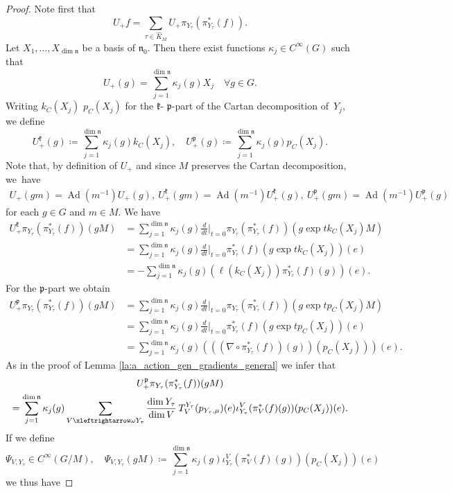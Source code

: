 \documentclass[JEP,XML,SOM,NoFloatCountersInSection,Unicode,published]{cedram}
\theoremstyle{definition}
\renewcommand{\d}[1][t]{\ensuremath{\frac{d}{d#1}\Big|_{#1=0}}}
\newcommand{\lraomega}{\ensuremath{\xleftrightarrow\omega}}
\newcommand{\mf}[1]{\ensuremath{\mathfrak{#1}}}
\newcommand{\on}[1]{\ensuremath{\operatorname{#1}}}
\newcommand{\Ck}[1]{\ensuremath{k_C(#1)}}
\newcommand{\Cp}[1]{\ensuremath{p_C(#1)}}
\begin{document}
\begin{proof}
Note first that
\[
U_+f=\sum_{\tau\in\hat K_M}U_+\pi_{Y_\tau}(\pi_{Y_\tau}^*(f)).
\]
Let $X_1,\ldots,X_{\dim\mf n}$ be a basis of $\mf n_0$. Then there exist functions $\kappa_j\in C^\infty(G)$ such that
\[
U_+(g)=\sum_{j=1}^{\dim\mf n}\kappa_j(g)X_j\quad\forall g\in G.
\]
Writing $\Ck{X_j}$ \resp $\Cp{X_j}$ for the $\mf k$- \resp $\mf p$-part of the Cartan decomposition of~$Y_j$, we define
\[
U_+^\mf k(g)\coloneqq\sum_{j=1}^{\dim\mf n}\kappa_j(g)\Ck{X_j},\quad U_+^\mf p(g)\coloneqq\sum_{j=1}^{\dim\mf n}\kappa_j(g)\Cp{X_j}.
\]
Note that, by definition of $U_+$ and since $M$ preserves the Cartan decomposition, we~have
\begin{align*}
U_+(gm)=\on{Ad}(m^{-1})U_+(g),\ U_+^\mf k(gm)=\on{Ad}(m^{-1})U_+^\mf k(g),\ U_+^\mf p(gm)=\on{Ad}(m^{-1})U_+^\mf p(g)
\end{align*}
for each $g\in G$ and $m\in M$. We have
\begin{align}
\nonumber U_+^\mf k\pi_{Y_\tau}(\pi_{Y_\tau}^*(f))(gM)&=\sum_{j=1}^{\dim\mf n}\kappa_j(g)\d\pi_{Y_\tau}(\pi_{Y_\tau}^*(f))(g\exp t\Ck{X_j}M)\\
\nonumber&=\sum_{j=1}^{\dim\mf n}\kappa_j(g)\d\pi_{Y_\tau}^*(f)(g\exp t\Ck{X_j})(e)\\
\label{eq:proof_p_k_part}&=-\sum_{j=1}^{\dim\mf n}\kappa_j(g)(\ell(\Ck{X_j})\pi_{Y_\tau}^*(f)(g))(e).
\end{align}
For the $\mf p$-part we obtain
\begin{align*}
U_+^\mf p\pi_{Y_\tau}(\pi_{Y_\tau}^*(f))(gM)&=\sum_{j=1}^{\dim\mf n}\kappa_j(g)\d\pi_{Y_\tau}(\pi_{Y_\tau}^*(f))(g\exp t\Cp{X_j}M)\\
&=\sum_{j=1}^{\dim\mf n}\kappa_j(g)\d\pi_{Y_\tau}^*(f)(g\exp t\Cp{X_j})(e)\\
&=\sum_{j=1}^{\dim\mf n}\kappa_j(g)(((\nabla\circ\pi_{Y_\tau}^*(f))(g))(\Cp{X_j}))(e).
\end{align*}
As in the proof of Lemma \ref{la:a_action_gen_gradients_general} we infer that
\begin{multline*}
U_+^\mf p\pi_{Y_\tau}(\pi_{Y_\tau}^*(f))(gM)\\
=\sum_{j=1}^{\dim\mf n}\kappa_j(g)\sum_{V\lraomega Y_\tau}\frac{\dim Y_\tau}{\dim V}\,T_V^{Y_\tau}(p_{Y_\tau,\mu})(e)\iota_{Y_\tau}^V(\pi_{V}^*(f)(g))(\Cp{X_j})(e).
\end{multline*}
If we define
\[
\Psi_{V,Y_\tau}\in C^\infty(G/M),\quad\Psi_{V,Y_\tau}(gM)\coloneqq\sum_{j=1}^{\dim\mf n}\kappa_j(g)\iota_{Y_\tau}^V(\pi_{V}^*(f)(g))(\Cp{X_j})(e)
\]
we thus have

\end{proof}
\end{document}
